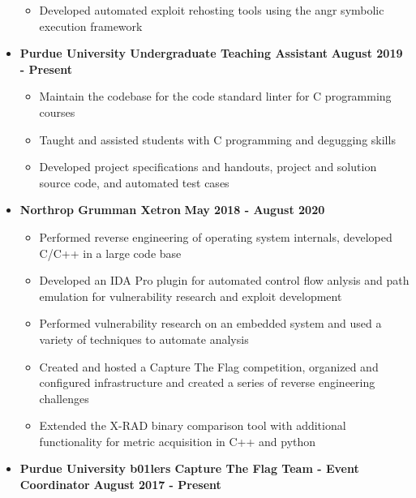 \documentclass[letterpaper,10pt]{article}
\begin{document}
\begin{flushleft}
\begin{itemize}
            \begin{itemize}
                \item Developed automated exploit rehosting tools using the angr symbolic execution framework \\
            \end{itemize}
        \item \textbf{Purdue University Undergraduate Teaching Assistant} \hfill \textbf{August 2019 - Present} \\
            \begin{itemize}
                \item Maintain the codebase for the code standard linter for C programming courses \\
                \item Taught and assisted students with C programming and degugging skills \\
                \item Developed project specifications and handouts, project and solution source code, and automated test cases \\
            \end{itemize}
		\item \textbf{Northrop Grumman Xetron} \hfill \textbf{May 2018 - August 2020} \\
			\begin{itemize}
                \item Performed reverse engineering of operating system internals, developed C/C++ in a large code base \\
				\item Developed an IDA Pro plugin for automated control flow anlysis and path emulation for vulnerability research and exploit development \\
				\item Performed vulnerability research on an embedded system and used a variety of techniques to automate analysis \\
				\item Created and hosted a Capture The Flag competition, organized and configured infrastructure and created a series of reverse engineering challenges \\
				\item Extended the X-RAD binary comparison tool with additional functionality for metric acquisition in C++ and python \\
			\end{itemize}
		\item \textbf{Purdue University b01lers Capture The Flag Team - Event Coordinator} \hfill \textbf{August 2017 - Present} \\

\end{itemize}
\end{flushleft}
\end{document}
